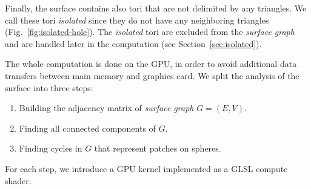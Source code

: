 Finally, the surface contains also tori that are not delimited by any triangles.
We call these tori \textit{isolated} since they do not have any neighboring triangles (Fig.~\ref{fig:isolated-hole}).
The \textit{isolated} tori are excluded from the \textit{surface graph} and are handled later in the computation (see Section~\ref{sec:isolated}).


The whole computation is done on the GPU, in order to avoid additional data transfers between main memory and graphics card.
We split the analysis of the surface into three steps:

\begin{enumerate}
  \item Building the adjacency matrix of \textit{surface graph} $G = (E, V)$.
	\item Finding all connected components of $G$.
	\item Finding cycles in $G$ that represent patches on spheres.
\end{enumerate}

For each step, we introduce a GPU kernel implemented as a GLSL compute shader.

